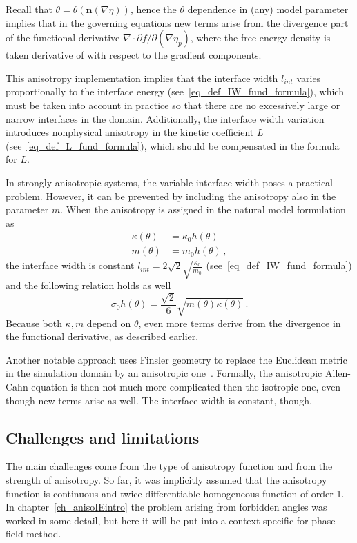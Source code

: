 	Recall that $\theta=\theta(\bm{n}(\nabla\eta))$, hence the $\theta$ dependence in (any) model parameter implies that in the governing equations new terms arise from the divergence part of the functional derivative $\nabla\cdot\partial f/\partial(\nabla \eta_p)$, where the free energy density is taken derivative of with respect to the gradient components.
	
	This anisotropy implementation implies that the interface width $l_{int}$ varies proportionally to the interface energy (see~\eqref{eq_def_IW_fund_formula}), which must be taken into account in practice so that there are no excessively large or narrow interfaces in the domain. Additionally, the interface width variation introduces nonphysical anisotropy in the kinetic coefficient $L$ (see~\eqref{eq_def_L_fund_formula}), which should be compensated in the formula for $L$.
	
	In strongly anisotropic systems, the variable interface width poses a practical problem. However, it can be prevented by including the anisotropy also in the parameter $m$. When the anisotropy is assigned in the natural model formulation as
	\begin{align}
		\kappa(\theta) 	&= \kappa_0 h(\theta) \\
		m(\theta) 		&= m_0 h(\theta) \,,
	\end{align}
	the interface width is constant $l_{int}=2\sqrt{2}\sqrt{\frac{\kappa_0}{m_0}} $ (see~\eqref{eq_def_IW_fund_formula}) and the following relation holds as well
	\begin{equation}
		\sigma_0 h(\theta) = \frac{\sqrt{2}}{6}\sqrt{m(\theta)\kappa(\theta)} \,.
	\end{equation}
	Because both $\kappa,m$ depend on $\theta$, even more terms derive from the divergence in the functional derivative, as described earlier. 

	Another notable approach uses Finsler geometry to replace the Euclidean metric in the simulation domain by an anisotropic one~\cite{Bellettini1996,Benes2003}. Formally, the anisotropic Allen-Cahn equation is then not much more complicated then the isotropic one, even though new terms arise as well. The interface width is constant, though.
	
	\subsection{Challenges and limitations}
	The main challenges come from the type of anisotropy function and from the strength of anisotropy. So far, it was implicitly assumed that the anisotropy function is continuous and twice-differentiable homogeneous function of order 1. In chapter~\ref{ch_anisoIEintro} the problem arising from forbidden angles was worked in some detail, but here it will be put into a context specific for phase field method.
	
